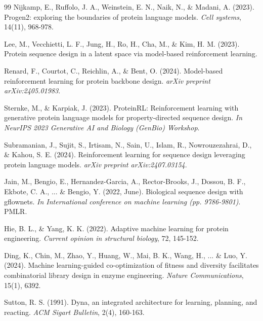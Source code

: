 \documentclass[12pt, a4paper]{article}
\begin{document}
\begin{thebibliography}{99}
Nijkamp, E., Ruffolo, J. A., Weinstein, E. N., Naik, N., \& Madani, A. (2023). \newblock Progen2: exploring the boundaries of protein language models. \newblock \textit{Cell systems}, 14(11), 968-978.


Lee, M., Vecchietti, L. F., Jung, H., Ro, H., Cha, M., \& Kim, H. M. (2023). \newblock Protein sequence design in a latent space via model-based reinforcement learning.


Renard, F., Courtot, C., Reichlin, A., \& Bent, O. (2024). \newblock Model-based reinforcement learning for protein backbone design. \newblock \textit{arXiv preprint arXiv:2405.01983}.


Sternke, M., \& Karpiak, J. (2023). \newblock ProteinRL: Reinforcement learning with generative protein language models for property-directed sequence design. \newblock \textit{In NeurIPS 2023 Generative AI and Biology (GenBio) Workshop}.


Subramanian, J., Sujit, S., Irtisam, N., Sain, U., Islam, R., Nowrouzezahrai, D., \& Kahou, S. E. (2024). \newblock Reinforcement learning for sequence design leveraging protein language models. \newblock \textit{arXiv preprint arXiv:2407.03154}.


Jain, M., Bengio, E., Hernandez-Garcia, A., Rector-Brooks, J., Dossou, B. F., Ekbote, C. A., ... \& Bengio, Y. (2022, June). \newblock Biological sequence design with gflownets. \newblock \textit{In International conference on machine learning (pp. 9786-9801)}. PMLR.


Hie, B. L., \& Yang, K. K. (2022). \newblock Adaptive machine learning for protein engineering. \newblock \textit{Current opinion in structural biology}, 72, 145-152.


Ding, K., Chin, M., Zhao, Y., Huang, W., Mai, B. K., Wang, H., ... \& Luo, Y. (2024). \newblock Machine learning-guided co-optimization of fitness and diversity facilitates combinatorial library design in enzyme engineering. \newblock \textit{Nature Communications}, 15(1), 6392.


Sutton, R. S. (1991). \newblock Dyna, an integrated architecture for learning, planning, and reacting. \newblock \textit{ACM Sigart Bulletin}, 2(4), 160-163.





\end{thebibliography}
\end{document}
